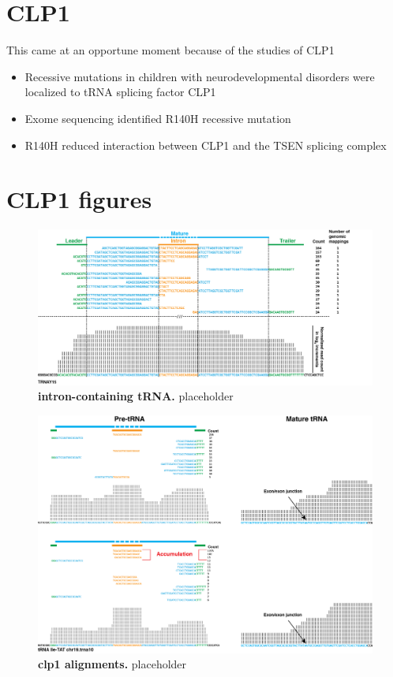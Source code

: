 \documentclass[12pt]{rockefeller}
\begin{document}
\section{CLP1}\label{clp1section}
This came at an opportune moment because of the studies of CLP1 
\begin{itemize}
\item Recessive mutations in children with neurodevelopmental disorders were localized to tRNA splicing factor CLP1 
\item Exome sequencing identified R140H recessive mutation
\item R140H reduced interaction between CLP1 and the TSEN splicing complex
\end{itemize}

\section{CLP1 figures}

\begin{figure}[!ht]%
\centering
\includegraphics[width=\textwidth]{intron_trna.png}%
\caption[intrno-containing tRNA]
{\textbf{intron-containing tRNA.}
placeholder}
\centering
\label{introntrna}%
\end{figure}

\begin{figure}[!ht]%
\centering
\includegraphics[width=\textwidth]{clp1align.png}%
\caption[clp1 alignments]
{\textbf{clp1 alignments.}
placeholder}
\centering
\label{clp1align}%
\end{figure}
\end{document}
